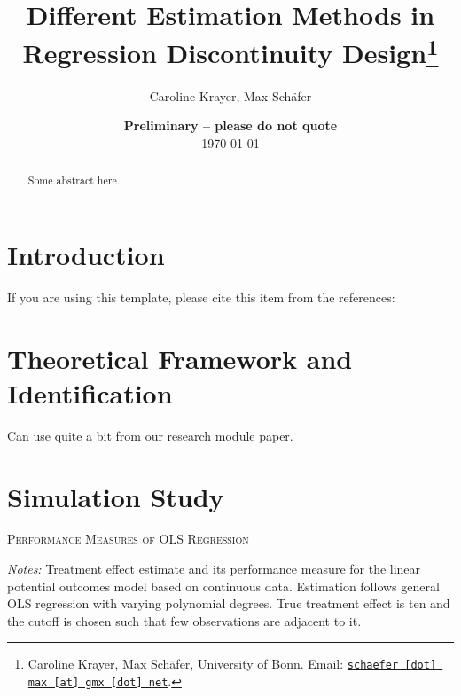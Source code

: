 \documentclass[11pt, a4paper, leqno]{article}
\begin{document}
\title{Different Estimation Methods in Regression Discontinuity Design\thanks{Caroline Krayer, Max Schäfer, University of Bonn. Email: \href{mailto:schaefer.max@gmx.net}{\nolinkurl{schaefer [dot] max [at] gmx [dot] net}}.}}

\author{Caroline Krayer, Max Schäfer}

\date{
{\bf Preliminary -- please do not quote}
\\[1ex]
\today
}

\maketitle


\begin{abstract}
	Some abstract here.
\end{abstract}
\clearpage

\section{Introduction} %
\label{sec:introduction}

If you are using this template, please cite this item from the references: \citet{GaudeckerEconProjectTemplates}




\section{Theoretical Framework and Identification} %
\label{sec:framework}

Can use quite a bit from our research module paper.



\section{Simulation Study} %
\label{sec:sim_study}



\begin{table}
	\centering

	

	\caption{\textsc{Performance Measures of OLS Regression}}
	\label{tab:perform_meas_table_linear_parametric_discrete_False_c_1}
	\medskip
	\raggedright
	\footnotesize
	\textit{Notes:} Treatment effect estimate and its performance measure for the linear potential outcomes model based on continuous data. Estimation follows general OLS regression with varying polynomial degrees. True treatment effect is ten and the cutoff is chosen such that few observations are adjacent to it. \\
\end{table}
\end{document}
